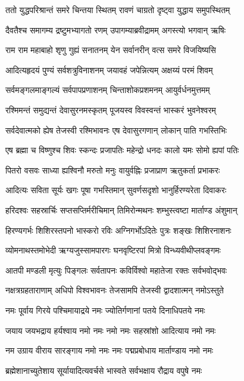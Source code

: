 
\twolineshloka
{ततो युद्धपरिश्रान्तं समरे चिन्तया स्थितम्}
{रावणं चाग्रतो दृष्ट्वा युद्धाय समुपस्थितम्}

\twolineshloka
{दैवतैश्च समागम्य द्रष्टुमभ्यागतो रणम्}
{उपागम्याब्रवीद्रामम् अगस्त्यो भगवान् ऋषिः}

\twolineshloka
{राम राम महाबाहो शृणु गुह्यं सनातनम्}
{येन सर्वानरीन् वत्स समरे विजयिष्यसि}

\twolineshloka
{आदित्यहृदयं पुण्यं सर्वशत्रुविनाशनम्}
{जयावहं जपेन्नित्यम् अक्षय्यं परमं शिवम्}

\twolineshloka
{सर्वमङ्गलमाङ्गल्यं सर्वपापप्रणाशनम्}
{चिन्ताशोकप्रशमनम् आयुर्वर्धनमुत्तमम्}

\twolineshloka
{रश्मिमन्तं समुद्यन्तं देवासुरनमस्कृतम्}
{पूजयस्व विवस्वन्तं भास्करं भुवनेश्वरम्}

\twolineshloka
{सर्वदेवात्मको ह्येष तेजस्वी रश्मिभावनः}
{एष देवासुरगणान् लोकान् पाति गभस्तिभिः}

\twolineshloka
{एष ब्रह्मा च विष्णुश्च शिवः स्कन्दः प्रजापतिः}
{महेन्द्रो धनदः कालो यमः सोमो ह्यपां पतिः}

\twolineshloka
{पितरो वसवः साध्या ह्यश्विनौ मरुतो मनुः}
{वायुर्वह्निः प्रजाप्राण ऋतुकर्ता प्रभाकरः}

\twolineshloka
{आदित्यः सविता सूर्यः खगः पूषा गभस्तिमान्}
{सुवर्णसदृशो भानुर्हिरण्यरेता दिवाकरः}

\twolineshloka
{हरिदश्वः सहस्रार्चिः सप्तसप्तिर्मरीचिमान्}
{तिमिरोन्मथनः शम्भुस्त्वष्टा मार्ताण्ड अंशुमान्}

\twolineshloka
{हिरण्यगर्भः शिशिरस्तपनो भास्करो रविः}
{अग्निगर्भोऽदितेः पुत्रः शङ्खः शिशिरनाशनः}

\twolineshloka
{व्योमनाथस्तमोभेदी ऋग्यजुस्सामपारगः}
{घनवृष्टिरपां मित्रो विन्ध्यवीथीप्लवङ्गमः}

\twolineshloka
{आतपी मण्डली मृत्युः पिङ्गलः सर्वतापनः}
{कविर्विश्वो महातेजा रक्तः सर्वभवोद्भवः}

\twolineshloka
{नक्षत्रग्रहताराणाम् अधिपो विश्वभावनः}
{तेजसामपि तेजस्वी द्वादशात्मन् नमोऽस्तुते}

\twolineshloka
{नमः पूर्वाय गिरये पश्चिमायाद्रये नमः}
{ज्योतिर्गणानां पतये दिनाधिपतये नमः}

\twolineshloka
{जयाय जयभद्राय हर्यश्वाय नमो नमः}
{नमो नमः सहस्रांशो आदित्याय नमो नमः}

\twolineshloka
{नम उग्राय वीराय सारङ्गाय नमो नमः}
{नमः पद्मप्रबोधाय मार्ताण्डाय नमो नमः}

\twolineshloka
{ब्रह्मेशानाच्युतेशाय सूर्यायादित्यवर्चसे}
{भास्वते सर्वभक्षाय रौद्राय वपुषे नमः}

